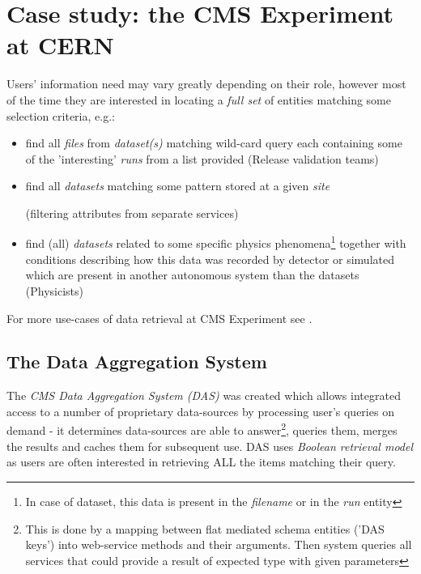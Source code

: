 \documentclass[a4paper,11pt,draft]{article}
\begin{document}


\section{Case study: the CMS Experiment at CERN}
Users' information need may vary greatly depending on their role, however most of the time they are interested in locating a \textit{full set} of entities matching some selection criteria, e.g.:
   \begin{itemize}
  		\item find all \textit{files} from \textit{dataset(s)} matching wild-card query each containing some of the 'interesting' \textit{runs} from a list provided (Release validation teams)
         \item find all \textit{datasets} matching some pattern stored at a given \textit{site} 
         	  \begin{small}(filtering attributes from separate services)\end{small}
         \item find (all) \textit{datasets} related to some specific physics phenomena\footnote{In case of dataset, this data is present in the \textit{filename} or in the \textit{run} entity} together with conditions describing how this data was recorded by detector or simulated which are present in another autonomous system than the datasets (Physicists)
   \end{itemize}                		

For more use-cases of data retrieval at CMS Experiment see \cite{CMS_data08}.

\subsection*{The Data Aggregation System}

The \textit{CMS Data Aggregation System (DAS)}\cite{Kuznetsov2010, Kuznetsov2011} was created which allows integrated access to a number of proprietary data-sources by processing user's queries on demand - it determines  data-sources are able to answer\footnote{This is done by a mapping between flat mediated schema entities ('DAS keys') into web-service methods and their arguments. Then system queries all services that could provide a result of expected type with given parameters}, queries them, merges the results and caches them for subsequent use. DAS uses \textit{Boolean retrieval model} as users are often interested in retrieving ALL the items matching their query.
\end{document}
